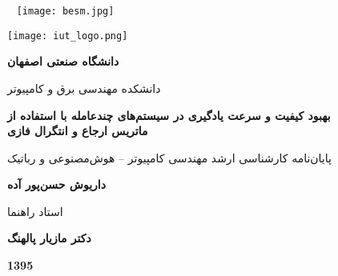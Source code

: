 

\thispagestyle{empty}
\mbox{}
\pagebreak

\thispagestyle{empty}
\begin{center}
	~\vfill
	\texttt{[image: besm.jpg]}
	~\vfill
\end{center}
\pagebreak

\thispagestyle{empty}
\begin{center}
\texttt{[image: iut\_logo.png]}
\vspace{0.4cm}

\textbf{دانشگاه صنعتی اصفهان}\\
\vspace{0.4cm}

{\large

	دانشکده مهندسی برق و کامپیوتر
}
\vspace{3.5cm}

{\Large
	\textbf{بهبود کیفیت و سرعت یادگیری در سیستم‌های چندعامله با استفاده از
	\\\vspace{1em}
	ماتریس ارجاع و انتگرال فازی}\\
}
\vspace{3.5cm}

{\Large
	پایان‌نامه کارشناسی ارشد مهندسی کامپیوتر -- هوش‌مصنوعی و رباتیک\\
}
\vspace{1cm}

{\large
	\textbf{داریوش حسن‌پور آده}\\
}
\vspace{3.5cm}

{\large
	استاد راهنما\\
}
\vspace{0.5cm}

{\large
	\textbf{دکتر مازیار پالهنگ}\\
}
\vfill

\textbf{1395}

\end{center}
\restoregeometry
\pagebreak

